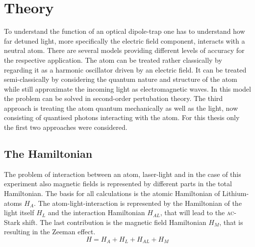 \chapter{Theory}

To understand the function of an optical dipole-trap one has to understand how far detuned light, more specifically the electric field component, interacts with a neutral atom. There are several models providing different levels of accuracy for the respective application. The atom can be treated rather classically by regarding it as a harmonic oscillator driven by an electric field. It can be treated semi-classically by considering the quantum nature and structure of the atom while still approximate the incoming light as electromagnetic waves. In this model the problem can be solved in second-order pertubation theory. The third approach is treating the atom quantum mechanically as well as the light, now consisting of quantised photons interacting with the atom. For this thesis only the first two approaches were considered. 

\section{The Hamiltonian}

The problem of interaction between an atom, laser-light and in the case of this experiment also magnetic fields is represented by different parts in the total Hamiltonian. The basis for all calculations is the atomic Hamiltonian of Lithium-atoms $H_A$. The atom-light-interaction is represented by the Hamiltonian of the light itself $H_L$ and the interaction Hamiltonian $H_{AL}$, that will lead to the \textsc{ac}-Stark shift. The last contribution is the magnetic field Hamiltonian $H_M$, that is resulting in the Zeeman effect.
\begin{equation}
H=H_A+H_L+H_{AL}+H_{M}
\end{equation}\label{Hamiltonian}

